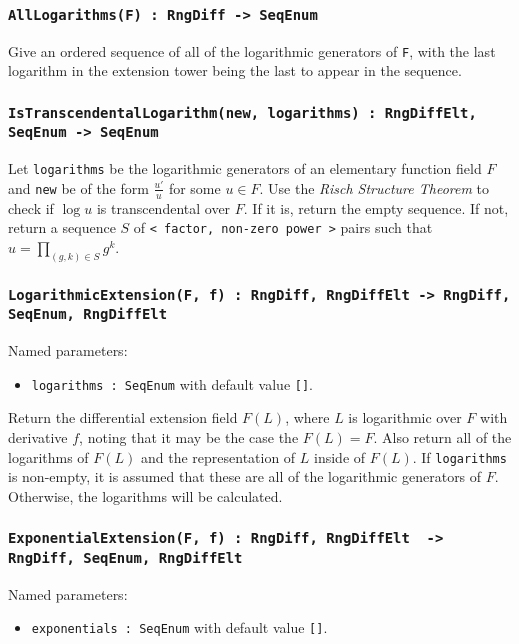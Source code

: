 \documentclass{article}
\theoremstyle{plain}
\theoremstyle{definition}
\begin{document}
\subsubsection*{\lstinline{AllLogarithms(F) : RngDiff -> SeqEnum}}
Give an ordered sequence of all of the logarithmic generators of \lstinline{F},
with the last logarithm in the extension tower being the last to appear in the
sequence.

\subsubsection*{\lstinline{IsTranscendentalLogarithm(new, logarithms) : RngDiffElt, SeqEnum -> SeqEnum}}
Let \lstinline{logarithms} be the logarithmic generators of an elementary
function field $F$ and \lstinline{new} be of the form $\frac {u'} u$ for some
$u \in F$. Use the \emph{Risch Structure Theorem} to check if $\log u$ is
transcendental over $F$. If it is, return the empty sequence. If not, return a
sequence $S$ of \lstinline{< factor, non-zero power >} pairs such that $u =
\prod_{(g, k) \in S} g^k$.

\subsubsection*{\lstinline{LogarithmicExtension(F, f) : RngDiff, RngDiffElt -> RngDiff, SeqEnum, RngDiffElt}}

Named parameters:
\begin{itemize}
    \item[] \lstinline{logarithms : SeqEnum} with default value \lstinline{[]}.
\end{itemize}

\noindent Return the differential extension field $F(L)$, where $L$ is
logarithmic over $F$ with derivative $f$, noting that it may be the case the
$F(L) = F$. Also return all of the logarithms of $F(L)$ and the representation
of $L$ inside of $F(L)$. If \lstinline{logarithms} is non-empty, it is assumed
that these are all of the logarithmic generators of $F$. Otherwise, the
logarithms will be calculated.

\subsubsection*{\lstinline{ExponentialExtension(F, f) : RngDiff, RngDiffElt  -> RngDiff, SeqEnum, RngDiffElt}}

Named parameters:
\begin{itemize}
    \item[] \lstinline{exponentials : SeqEnum} with default value \lstinline{[]}.
\end{itemize}
\end{document}
